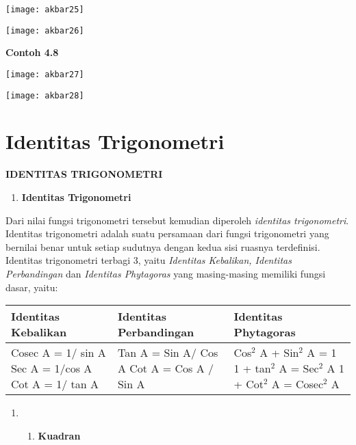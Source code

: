 \documentclass[11pt,fleqn]{book} %
\begin{document}
\noindent 

\noindent 

\noindent \texttt{[image: akbar25]}

\noindent \eject 

\noindent \texttt{[image: akbar26]}

\noindent \textbf{Contoh 4.8}

\noindent \texttt{[image: akbar27]}

\noindent \texttt{[image: akbar28]}

\noindent 


\section{Identitas Trigonometri}

\noindent \textbf{IDENTITAS TRIGONOMETRI}

\begin{enumerate}
\item \textbf{ Identitas Trigonometri}
\end{enumerate}

Dari nilai fungsi trigonometri tersebut kemudian diperoleh \textit{identitas trigonometri}. Identitas trigonometri adalah suatu persamaan dari fungsi trigonometri yang bernilai benar untuk setiap sudutnya dengan kedua sisi ruasnya terdefinisi. Identitas trigonometri terbagi 3, yaitu \textit{Identitas Kebalikan, Identitas Perbandingan }dan\textit{ Identitas Phytagoras} yang masing-masing memiliki fungsi dasar, yaitu:

\begin{tabular}{|p{1.8in}|p{1.9in}|p{1.8in}|} \hline 
Identitas Kebalikan & Identitas Perbandingan & Identitas Phytagoras \\ \hline 
Cosec A = 1/ sin A Sec A = 1/cos A Cot A = 1/ tan A & Tan A = Sin A/ Cos A Cot A = Cos A / Sin A  & Cos${}^{2}$ A + Sin${}^{2}$ A = 1 1 + tan${}^{2}$ A = Sec${}^{2}$ A 1 + Cot${}^{2}$ A = Cosec${}^{2}$ A \\ \hline 
\end{tabular}

\textbf{}

\begin{enumerate}
\item \begin{enumerate}
\item \textbf{ Kuadran}
\end{enumerate}
\end{enumerate}
\end{document}
